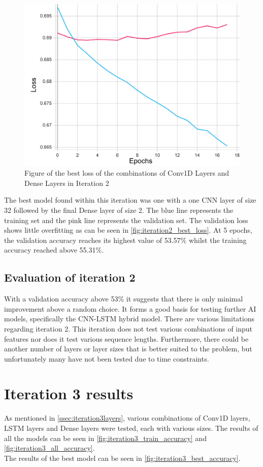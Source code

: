\begin{figure}[ht]
    \centering
    \includegraphics[width=0.95\columnwidth]{figures/results/cnn/cnn_1C32-1D64_loss.pdf}
    \caption[Best loss for Iteration 2]{Figure of the best loss of the combinations of Conv1D Layers and Dense Layers in Iteration 2}
    \label{fig:iteration2_best_loss}
\end{figure}
\FloatBarrier

The best model found within this iteration was one with a one CNN layer of size 32 followed
by the final Dense layer of size 2. The blue line represents the training set and the pink line represents
the validation set. The validation loss shows little overfitting as can be seen in
\autoref{fig:iteration2_best_loss}. At 5 epochs, the validation accuracy reaches its highest value of
53.57\% whilst the training accuracy reached above 55.31\%.
\subsection{Evaluation of iteration 2}
With a validation accuracy above 53\% it suggests that there is only minimal improvement above a random choice. It forms a good
basis for testing further AI models, specifically the CNN-LSTM hybrid model.
There are various limitations regarding iteration 2. This iteration does not test various combinations of
input features nor does it test various sequence lengths. Furthermore, there could be another number of layers or
layer sizes that is better suited to the problem, but unfortunately many have not been tested due to time constraints.

\section{Iteration 3 results}\label{iteration3_results}
As mentioned in \autoref{ssec:iteration3layers}, various combinations of Conv1D layers, LSTM layers and Dense layers were tested,
each with various sizes. The results of all the models can be seen in \autoref{fig:iteration3_train_accuracy}
and \autoref{fig:iteration3_all_accuracy}.\\
The results of the best model can be seen in \autoref{fig:iteration3_best_accuracy}.

